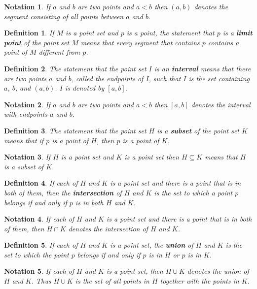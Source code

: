 \documentclass{article}
\newtheorem{definition}{Definition}
\newtheorem{notation}{Notation}
\begin{document}
\begin{notation}
If $a$ and $b$ are two points and $a < b$ then $(a, b)$ denotes the segment consisting of all points between $a$ and $b$.
\end{notation}
\begin{definition}
If $M$ is a point set and $p$ is a point, the statement that $p$ is a \textbf{limit point} of the point set $M$ means that every segment that contains $p$ contains a point of $M$ different from $p$.
\end{definition}

\begin{definition}
The statement that the point set $I$ is an \textbf{interval} means that there are two points $a$ and $b$, called the \textit{endpoints} of $I$, such that $I$ is the set containing $a$, $b$, and $(a, b)$. $I$ is denoted by $[a, b]$.
\end{definition}
\begin{notation}
If $a$ and $b$ are two points and $a < b$ then $[a, b]$ denotes the interval with endpoints $a$ and $b$.
\end{notation}

\begin{definition}
The statement that the point set $H$ is a \textbf{subset} of the point set $K$ means that if $p$ is a point of $H$, then $p$ is a point of $K$. 
\end{definition}
\begin{notation}
If $H$ is a point set and $K$ is a point set then $H \subseteq K$ means that $H$ is a subset of $K$.
\end{notation}

\begin{definition}
If each of $H$ and $K$ is a point set and there is a point that is in both of them, then the \textbf{intersection} of $H$ and $K$ is the set to which a point $p$ belongs if and only if $p$ is in both $H$ and $K$.
\end{definition}
\begin{notation}
If each of $H$ and $K$ is a point set and there is a point that is in both of them, then $H \cap K$ denotes the intersection of $H$ and $K$.
\end{notation}

\begin{definition}
If each of $H$ and $K$ is a point set, the \textbf{union} of $H$ and $K$ is the set to which the point $p$ belongs if and only if $p$ is in $H$ or $p$ is in $K$.
\end{definition}
\begin{notation}
If each of $H$ and $K$ is a point set, then $H \cup K$ denotes the union of $H$ and $K$. Thus $H \cup K$ is the set of all points in $H$ together with the points in $K$.
\end{notation}
\end{document}
